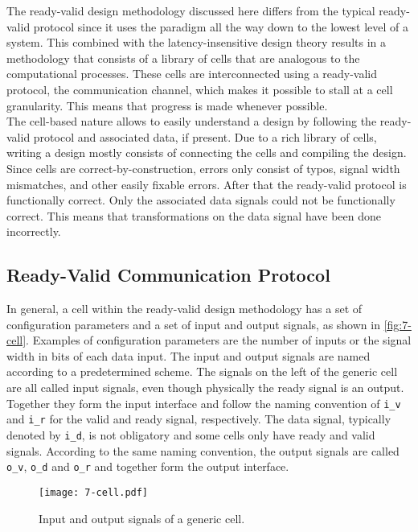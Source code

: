 The ready-valid design methodology discussed here differs from the typical ready-valid protocol since it uses the paradigm all the way down to the lowest level of a system. This combined with the latency-insensitive design theory results in a methodology that consists of a library of cells that are analogous to the computational processes. These cells are interconnected using a ready-valid protocol, the communication channel, which makes it possible to stall at a cell granularity. This means that progress is made whenever possible.\\
The cell-based nature allows to easily understand a design by following the ready-valid protocol and associated data, if present. Due to a rich library of cells, writing a design mostly consists of connecting the cells and compiling the design. Since cells are correct-by-construction, errors only consist of typos, signal width mismatches, and other easily fixable errors. After that the ready-valid protocol is functionally correct. Only the associated data signals could not be functionally correct. This means that transformations on the data signal have been done incorrectly.



\subsection{Ready-Valid Communication Protocol}
In general, a cell within the ready-valid design methodology has a set of configuration parameters and a set of input and output signals, as shown in \autoref{fig:7-cell}. Examples of configuration parameters are the number of inputs or the signal width in bits of each data input. The input and output signals are named according to a predetermined scheme. The signals on the left of the generic cell are all called input signals, even though physically the ready signal is an output. Together they form the input interface and follow the naming convention of \texttt{i\_v} and \texttt{i\_r} for the valid and ready signal, respectively. The data signal, typically denoted by \texttt{i\_d}, is not obligatory and some cells only have ready and valid signals. According to the same naming convention, the output signals are called \texttt{o\_v}, \texttt{o\_d} and \texttt{o\_r} and together form the output interface.

\begin{figure}[H]
  \centering
  \texttt{[image: 7-cell.pdf]}
  \caption{Input and output signals of a generic cell.}
  \label{fig:7-cell}
\end{figure}

